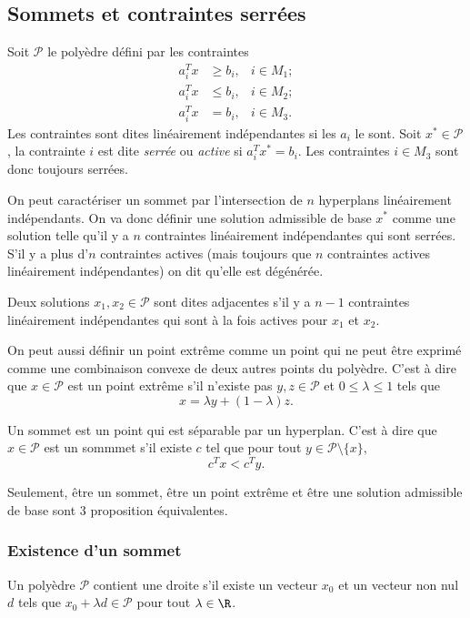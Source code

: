 \subsection{Sommets et contraintes serrées}
Soit $\mathcal{P}$ le polyèdre défini par les contraintes
\begin{align*}
  a_i^T x & \geq b_i, & i \in M_1;\\
  a_i^T x & \leq b_i, & i \in M_2;\\
  a_i^T x & = b_i, & i \in M_3.
\end{align*}
Les contraintes sont dites linéairement indépendantes si les $a_i$ le sont.
Soit $x^* \in \mathcal{P}$,
la contrainte $i$ est dite \emph{serrée} ou \emph{active} si $a_i^Tx^* = b_i$.
Les contraintes $i \in M_3$ sont donc toujours serrées.

On peut caractériser un sommet par l'intersection de $n$ hyperplans
linéairement indépendants.
On va donc définir une solution admissible de base $x^*$ comme une solution
telle qu'il y a $n$ contraintes linéairement indépendantes qui sont serrées.
S'il y a plus d'$n$ contraintes actives (mais toujours que $n$ contraintes
actives linéairement indépendantes) on dit qu'elle est dégénérée.

Deux solutions $x_1, x_2 \in \mathcal{P}$ sont dites
adjacentes s'il y a $n-1$ contraintes linéairement indépendantes qui sont
à la fois actives pour $x_1$ et $x_2$.

On peut aussi définir un point extrême comme
un point qui ne peut être exprimé comme une combinaison convexe de deux
autres points du polyèdre.
C'est à dire que $x\in \mathcal{P}$ est un point extrême s'il
n'existe pas $y,z \in \mathcal{P}$ et
$0 \leq \lambda \leq 1$ tels que
\[ x = \lambda y + (1-\lambda)z. \]

Un sommet est un point qui est séparable par un hyperplan.
C'est à dire que $x \in \mathcal{P}$ est un sommmet s'il existe $c$
tel que pour tout $y \in \mathcal{P}\setminus\{x\}$,
\[ c^Tx < c^Ty. \]

Seulement, être un sommet, être un point extrême et être une solution
admissible de base sont 3 proposition équivalentes.

\subsubsection{Existence d'un sommet}
\begin{mydef}
  Un polyèdre $\mathcal{P}$ contient une droite s'il existe un vecteur $x_0$
  et un vecteur non nul $d$ tels que $x_0 + \lambda d \in \mathcal{P}$
  pour tout $\lambda \in \R$.
\end{mydef}

